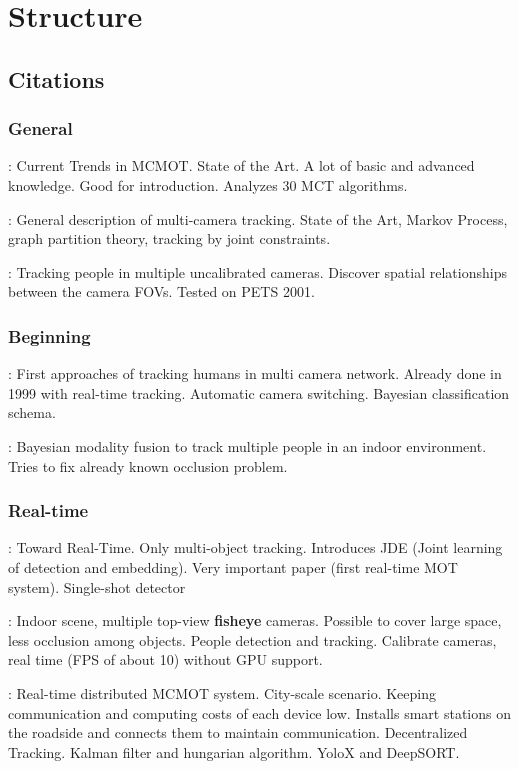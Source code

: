 \chapter{Structure}

\section{Citations}

\subsection{General}

\cite{Amosa23}: Current Trends in MCMOT. State of the Art. A lot of basic and advanced knowledge. Good for introduction. Analyzes 30 MCT algorithms.

\cite{Tian19}: General description of multi-camera tracking. State of the Art, Markov Process, graph partition theory, tracking by joint constraints.

\cite{Khan01}: Tracking people in multiple uncalibrated cameras. Discover spatial relationships between the camera FOVs. Tested on PETS 2001.

\subsection{Beginning}

\cite{Cai99}: First approaches of tracking humans in multi camera network. Already done in 1999 with real-time tracking. Automatic camera switching. Bayesian classification schema.

\cite{Chang01}: Bayesian modality fusion to track multiple people in an indoor environment. Tries to fix already known occlusion problem.

\subsection{Real-time}

\cite{Wang20}: Toward Real-Time. Only multi-object tracking. Introduces JDE (Joint learning of detection and embedding). Very important paper (first real-time MOT system). Single-shot detector

\cite{Wang21}: Indoor scene, multiple top-view \textbf{fisheye} cameras. Possible to cover large space, less occlusion among objects. People detection and tracking. Calibrate cameras, real time (FPS of about 10) without GPU support.

\cite{Chen22}: Real-time distributed MCMOT system. City-scale scenario. Keeping communication and computing costs of each device low. Installs smart stations on the roadside and connects them to maintain communication. Decentralized Tracking. Kalman filter and hungarian algorithm. YoloX and DeepSORT.

